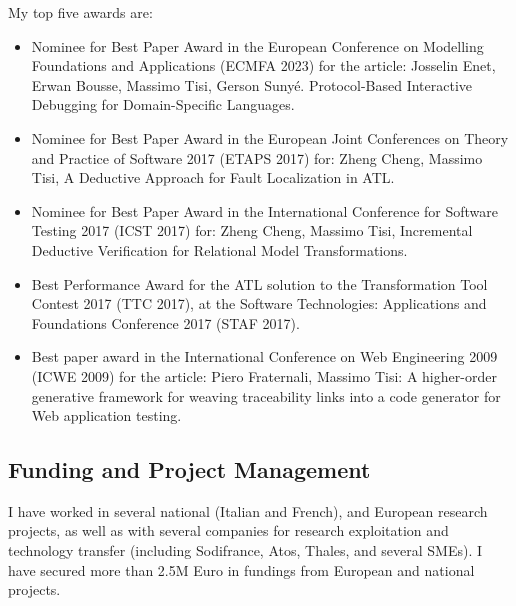 \medskip
My top five awards are: 
\begin{itemize}
\item Nominee for Best Paper Award in the European Conference on Modelling Foundations and Applications (ECMFA 2023) for the article: Josselin Enet, Erwan Bousse, Massimo Tisi, Gerson Sunyé. Protocol-Based Interactive Debugging for Domain-Specific Languages.
\item Nominee for Best Paper Award in the European Joint Conferences on Theory and Practice of Software 2017 (ETAPS 2017) for: Zheng Cheng, Massimo Tisi, A Deductive Approach for Fault Localization in ATL.
\item Nominee for Best Paper Award in the International Conference for Software Testing 2017 (ICST 2017) for: Zheng Cheng, Massimo Tisi, Incremental Deductive Verification for Relational Model Transformations.
\item Best Performance Award for the ATL solution to the Transformation Tool Contest 2017 (TTC 2017), at the Software Technologies: Applications and Foundations Conference 2017 (STAF 2017).
\item Best paper award in the International Conference on Web Engineering 2009 (ICWE 2009) for the article: Piero Fraternali, Massimo Tisi: A higher-order generative framework for weaving traceability links into a code generator for Web application testing.
\end{itemize}

\subsection*{Funding and Project Management}
I have worked in several national (Italian and French), and European research projects, as well as with several companies for research exploitation and technology transfer (including Sodifrance, Atos, Thales, and several SMEs). I have secured more than 2.5M Euro in fundings from European and national projects.


